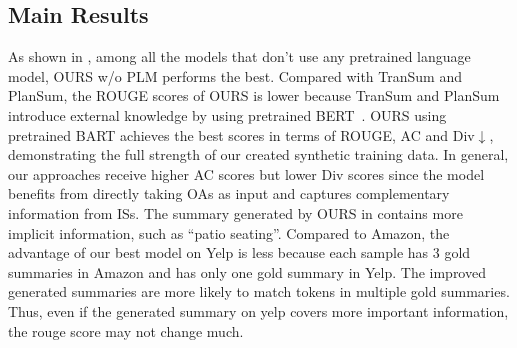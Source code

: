 \subsection{Main Results}
\label{sec:results}
As shown in  ,
among all the models that don't use any pretrained language model, 
OURS w/o PLM performs the best.
Compared with TranSum and PlanSum, the ROUGE scores of OURS is lower
because TranSum and PlanSum introduce external knowledge by using pretrained BERT~\cite{BERT19}.
OURS using pretrained BART achieves the best scores in terms of ROUGE, AC and Div$\downarrow$,
demonstrating the full strength of our created synthetic training data.
In general, our approaches receive higher AC scores but lower Div scores since the model benefits 
from directly taking OAs as input and captures complementary information from ISs. The summary generated by OURS in  contains more implicit information, such as ``patio seating''.
Compared to Amazon, the advantage of our best model on Yelp is less
because each sample has 3 gold summaries in Amazon and has only one gold summary in Yelp.
The improved generated summaries are more likely to match tokens in multiple gold summaries. 
Thus, even if the generated summary on yelp covers more important information, the rouge score may not change much.

